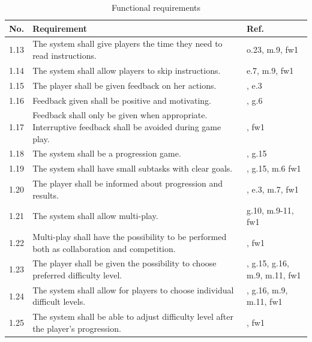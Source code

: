 \begin{table} [H]
\centering
\begin{tabular}{|>{\raggedright}p{}|p{}|p{}|}
\hline
\textbf{No.} & \textbf{Requirement} & \textbf{Ref.} \\ \hline
1.13 & The system shall give players the time they need to read instructions. & o.23, m.9, fw1 \\ \hline 
1.14 & The system shall allow players to skip instructions. & \cite{sweetser} e.7, m.9, fw1 \\ \hline 
1.15 & The player shall be given feedback on her actions. &  \cite{sweetser}, e.3 \\ \hline
1.16 & Feedback given shall be positive and motivating. &  \cite{sweetser}, g.6 \\ \hline
1.17 & Feedback shall only be given when appropriate. Interruptive feedback shall be avoided during game play. &  \cite{sweetser}, fw1 \\ \hline
1.18 & The system shall be a progression game. & \cite{understandingvg} \cite{sweetser}, g.15 \\ \hline
1.19 & The system shall have small subtasks with clear goals. &  \cite{sweetser} \cite{john2012smartsenior}, g.15, m.6 fw1\\ \hline
1.20 & The player shall be informed about progression and results. & \cite{sweetser} \cite{john2012smartsenior}, e.3, m.7, fw1 \\ \hline
1.21 & The system shall allow multi-play. & g.10, m.9-11, fw1 \\ \hline
1.22 & Multi-play shall have the possibility to be performed both as collaboration and competition. & \cite{sweetser}, fw1\\ \hline
1.23 & The player shall be given the possibility to choose preferred difficulty level. & \cite{sweetser}, g.15, g.16, m.9, m.11, fw1\\ \hline
1.24 & The system shall allow for players to choose individual difficult levels. & \cite{sweetser}, g.16, m.9, m.11, fw1\\ \hline
1.25 & The system shall be able to adjust difficulty level after the player's progression. & \cite{sweetser}, fw1 \\ \hline
    \end{tabular}
    \caption[Functional requirements, part 2]{Functional requirements}
    \label{tab:func2}
\end{table} 


